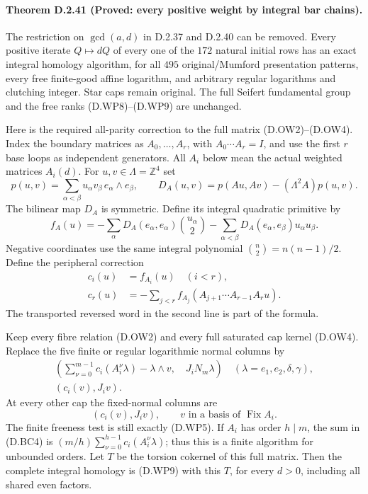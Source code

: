 \paragraph{Theorem D.2.41 (Proved: every positive weight by integral bar chains).}
The restriction on $\gcd(a,d)$ in D.2.37 and D.2.40 can
be removed. Every positive iterate $Q\mapsto dQ$ of
every one of the $172$ natural initial rows has an
exact integral homology algorithm, for all $495$
original/Mumford presentation patterns, every free
finite-good affine logarithm, and arbitrary regular
logarithms and clutching integer. Star caps remain
original. The full Seifert fundamental group and
the free ranks (D.WP8)--(D.WP9) are unchanged.

Here is the required all-parity correction to the
full matrix (D.OW2)--(D.OW4). Index the boundary
matrices as $A_0,\ldots,A_r$, with
$A_0\cdots A_r=I$, and use the first $r$ base loops
as independent generators. All $A_i$ below mean
the actual weighted matrices $A_i(d)$.
For $u,v\in\Lambda=\mathbb Z^4$ set
\[
 p(u,v)=\sum_{\alpha<\beta}u_\alpha v_\beta\,
                  e_\alpha\wedge e_\beta,\qquad
 D_A(u,v)=p(Au,Av)-(\Lambda^2A)p(u,v).
                                                        \tag{D.BC1}
\]
The bilinear map $D_A$ is symmetric. Define its
integral quadratic primitive by
\[
 f_A(u)=-\sum_\alpha D_A(e_\alpha,e_\alpha)
                       {u_\alpha\choose2}
        -\sum_{\alpha<\beta}D_A(e_\alpha,e_\beta)
                       u_\alpha u_\beta .
                                                        \tag{D.BC2}
\]
Negative coordinates use the same integral polynomial
$\binom n2=n(n-1)/2$.
Define the peripheral correction
\[
 \begin{split}
 c_i(u)&=f_{A_i}(u) \quad (i<r),\\
 c_r(u)&=-\sum_{j<r}
       f_{A_j}(A_{j+1}\cdots A_{r-1}A_r u).
 \end{split}                                            \tag{D.BC3}
\]
The transported reversed word in the second line
is part of the formula.

Keep every fibre relation (D.OW2) and every full
saturated cap kernel (D.OW4). Replace the five
finite or regular logarithmic normal columns by
\[
 \begin{gathered}
 \left(\sum_{\nu=0}^{m-1}c_i(A_i^\nu\lambda)
                  -\lambda\wedge v,\quad J_iN_m\lambda\right)
       \quad(\lambda=e_1,e_2,\delta,\gamma),\\
                       (c_i(v),J_iv).
 \end{gathered}                                          \tag{D.BC4}
\]
At every other cap the fixed-normal columns are
\[
                         (c_i(v),J_iv),
                         \qquad v\text{ in a basis of }\operatorname{Fix} A_i.
                                                        \tag{D.BC5}
\]
The finite freeness test is still exactly (D.WP5).
If $A_i$ has order $h\mid m$, the sum in (D.BC4)
is $(m/h)\sum_{\nu=0}^{h-1}c_i(A_i^\nu\lambda)$;
thus this is a finite algorithm for unbounded orders.
Let $T$ be the torsion cokernel of this full matrix.
Then the complete integral homology is (D.WP9)
with this $T$, for every $d>0$, including all
shared even factors.

